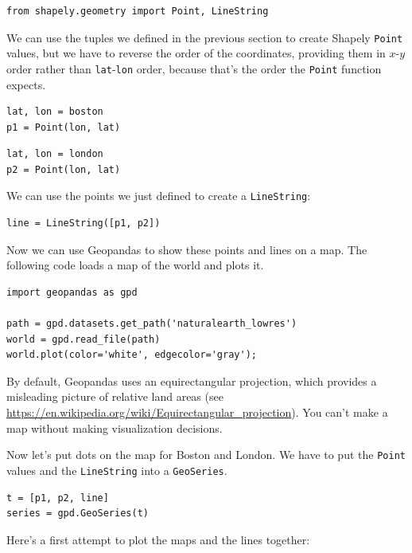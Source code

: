 \begin{lstlisting}[]
from shapely.geometry import Point, LineString
\end{lstlisting}

We can use the tuples we defined in the previous section to create
Shapely \passthrough{\lstinline!Point!} values, but we have to reverse
the order of the coordinates, providing them in \(x\)-\(y\) order rather
than \passthrough{\lstinline!lat!}-\passthrough{\lstinline!lon!} order,
because that's the order the \passthrough{\lstinline!Point!} function
expects.

\begin{lstlisting}[]
lat, lon = boston
p1 = Point(lon, lat)
\end{lstlisting}

\begin{lstlisting}[]
lat, lon = london
p2 = Point(lon, lat)
\end{lstlisting}

We can use the points we just defined to create a
\passthrough{\lstinline!LineString!}:

\begin{lstlisting}[]
line = LineString([p1, p2])
\end{lstlisting}

Now we can use Geopandas to show these points and lines on a map. The
following code loads a map of the world and plots it.

\begin{lstlisting}[]
import geopandas as gpd

path = gpd.datasets.get_path('naturalearth_lowres')
world = gpd.read_file(path)
world.plot(color='white', edgecolor='gray');
\end{lstlisting}

By default, Geopandas uses an equirectangular projection, which provides
a misleading picture of relative land areas (see
\url{https://en.wikipedia.org/wiki/Equirectangular_projection}). You
can't make a map without making visualization decisions.

Now let's put dots on the map for Boston and London. We have to put the
\passthrough{\lstinline!Point!} values and the
\passthrough{\lstinline!LineString!} into a
\passthrough{\lstinline!GeoSeries!}.

\begin{lstlisting}[]
t = [p1, p2, line]
series = gpd.GeoSeries(t)
\end{lstlisting}

Here's a first attempt to plot the maps and the lines together:

